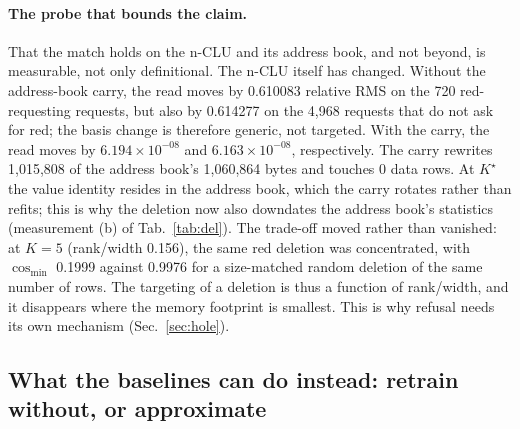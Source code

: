 \documentclass{article} %
\newcommand{\sci}[2]{\ensuremath{#1\times10^{#2}}}
\newcommand{\Kstar}{\ensuremath{K^{\star}}}
\begin{document}
\paragraph{The probe that bounds the claim.} That the match holds on the n-CLU and its address book,
and not beyond, is measurable, not only definitional.
The n-CLU itself has changed. Without the address-book carry, the read moves by 0.610083
relative RMS on the 720 red-requesting requests, but also by 0.614277 on the 4,968 requests
that do not ask for red; the basis change is therefore generic, not targeted. With the carry,
the read moves by \sci{6.194}{-08} and \sci{6.163}{-08}, respectively. The carry rewrites
1,015,808 of the address book's 1,060,864 bytes and touches 0 data rows. %
At $\Kstar$ the value identity
resides in the address book, which the carry rotates rather than refits; this is why the deletion
now also downdates the address book's statistics (measurement (b) of Tab.~\ref{tab:del}). The trade-off moved
rather than vanished: at $K=5$ (rank/width 0.156), the same red deletion was concentrated, with
$\cos_{\min}$ 0.1999 against 0.9976 for a size-matched random deletion of the same number of
rows. %
The targeting of a deletion is thus a function of rank/width, and it disappears where the memory footprint
is smallest. This is why refusal needs its own mechanism (Sec.~\ref{sec:hole}).

\subsection{What the baselines can do instead: retrain without, or approximate}
\label{sec:del-comparators}
\end{document}
